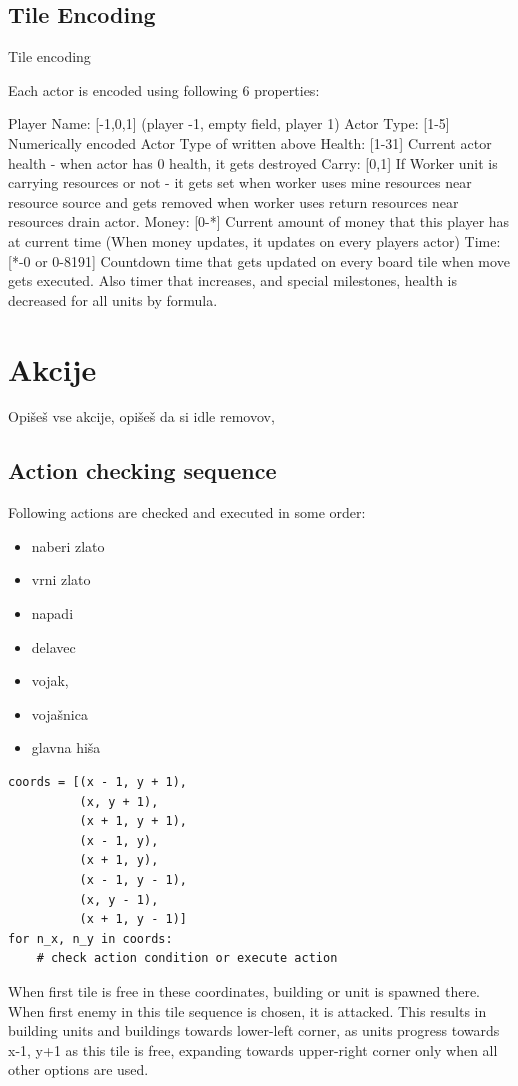 \documentclass[a4paper, 12pt]{book}
\begin{document}
\subsection{Tile Encoding}
Tile encoding

Each actor is encoded using following 6 properties:

Player Name: [-1,0,1] (player -1, empty field, player 1)
Actor Type: [1-5] Numerically encoded Actor Type of written above
Health: [1-31] Current actor health - when actor has 0 health, it gets destroyed
Carry: [0,1] If Worker unit is carrying resources or not - it gets set when worker uses mine resources near resource source and gets removed when worker uses return resources near resources drain actor.
Money: [0-*] Current amount of money that this player has at current time (When money updates, it updates on every players actor)
Time: [*-0 or 0-8191] Countdown time that gets updated on every board tile when move gets executed. Also timer that increases, and special milestones, health is decreased for all units by formula.


\section{Akcije}

Opišeš vse akcije, 
opišeš da si idle removov, 



\subsection{Action checking sequence
}
Following actions are checked and executed in some order:

\begin{itemize}
	\item naberi zlato
	\item vrni zlato
	\item napadi
	\item delavec
	\item vojak, 
	\item vojašnica
	\item glavna hiša
\end{itemize}
\begin{verbatim}
coords = [(x - 1, y + 1),
          (x, y + 1),
          (x + 1, y + 1),
          (x - 1, y),
          (x + 1, y),
          (x - 1, y - 1),
          (x, y - 1),
          (x + 1, y - 1)]
for n_x, n_y in coords:
    # check action condition or execute action
\end{verbatim}
When first tile is free in these coordinates, building or unit is spawned there.
When first enemy in this tile sequence is chosen, it is attacked.
This results in building units and buildings towards lower-left corner, as units progress towards x-1, y+1 as this tile is free, expanding towards upper-right corner only when all other options are used.
\end{document}
